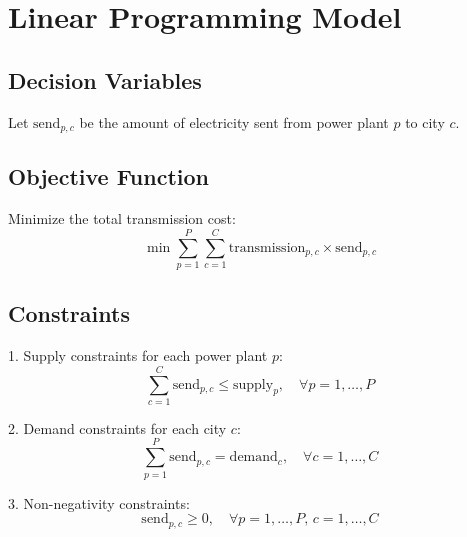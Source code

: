 \documentclass{article}
\begin{document}
\section*{Linear Programming Model}

\subsection*{Decision Variables}
Let \( \text{send}_{p,c} \) be the amount of electricity sent from power plant \( p \) to city \( c \).

\subsection*{Objective Function}
Minimize the total transmission cost:
\[
\min \sum_{p=1}^{P} \sum_{c=1}^{C} \text{transmission}_{p,c} \times \text{send}_{p,c}
\]

\subsection*{Constraints}

1. Supply constraints for each power plant \( p \):
\[
\sum_{c=1}^{C} \text{send}_{p,c} \leq \text{supply}_p, \quad \forall p = 1, \ldots, P
\]

2. Demand constraints for each city \( c \):
\[
\sum_{p=1}^{P} \text{send}_{p,c} = \text{demand}_c, \quad \forall c = 1, \ldots, C
\]

3. Non-negativity constraints:
\[
\text{send}_{p,c} \geq 0, \quad \forall p = 1, \ldots, P, \, c = 1, \ldots, C
\]
\end{document}
